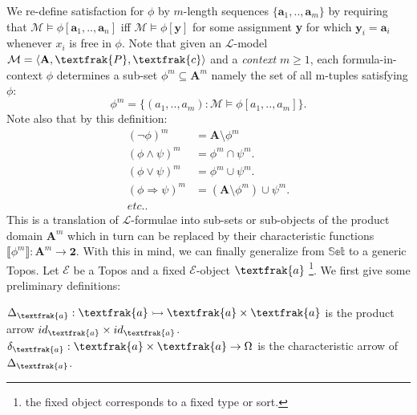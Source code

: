 We re-define satisfaction for $\phi$ by $m$-length sequences $\{ \textbf{a}_1,..,\textbf{a}_m \}$ by requiring that $\mathcal{M} \vDash \phi[\textbf{a}_1,..,\textbf{a}_n]$ iff $\mathcal{M} \vDash \phi[\textbf{y}]$ for some assignment \textbf{y} for which $\textbf{y}_i = \textbf{a}_i$ whenever $x_i$ is free in $\phi$.  \newline
Note that given an $\mathcal{L}$-model $\mathcal{M}= \langle \textbf{A}, \textfrak{P}, \textfrak{c} \rangle$ and a \emph{context} $m \geq 1$, each formula-in-context $\phi$ determines a sub-set $\phi^m \subseteq \textbf{A}^m$ namely the set of all m-tuples satisfying $\phi$:
\begin{equation*}
	\phi^m = \{(a_1,..,a_m) : \mathcal{M} \vDash \phi[a_1,..,a_m]\}.
\end{equation*}
Note also that by this definition:
\begin{align*} 
	(\neg \phi)^m &=  \textbf{A} \setminus \phi^m \\ 
	(\phi \land \psi)^m &=  \phi^m \cap \psi^m. \\
	(\phi \lor \psi)^m &=  \phi^m \cup \psi^m. \\
	(\phi \Rightarrow \psi)^m &=  (\textbf{A} \setminus \phi^m) \cup \psi^m. \\ etc..
\end{align*}
This is a translation of $\mathcal{L}$-formulae into sub-sets or sub-objects of the product domain $\textbf{A}^m$ which in turn can be replaced by their characteristic functions $\llbracket \phi^m \rrbracket : \textbf{A}^m \rightarrow \textbf{2}$. \newline
With this in mind, we can finally generalize from $\mathbb{Set}$ to a generic Topos.
\newline
\newline
Let $\mathcal{E}$ be a Topos and a fixed $\mathcal{E}$-object  $\textfrak{a}$ \footnote{the fixed object corresponds to a fixed type or sort.}.\newline
We first give some preliminary definitions:
\begin{definition}
	$\Delta_\textfrak{a} : \textfrak{a} \rightarrowtail \textfrak{a} \times \textfrak{a}$ is the product arrow $id_\textfrak{a} \times id_\textfrak{a}$.\newline
	$\delta_\textfrak{a} : \textfrak{a} \times \textfrak{a} \rightarrow \Omega$ is the characteristic arrow of $\Delta_\textfrak{a}$. 
\end{definition}

